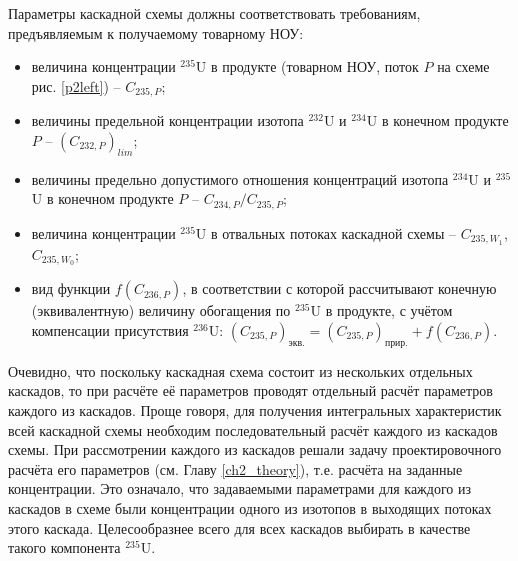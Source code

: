 Параметры каскадной схемы должны соответствовать требованиям, предъявляемым к получаемому товарному НОУ:

\begin{itemize}
    \item величина концентрации $^{235}$U в продукте (товарном НОУ, поток $P$ на схеме рис. \ref{p2left}) -- $C_{235,{P}}$;
    \item величины предельной концентрации изотопа $^{232}$U и $^{234}$U в конечном продукте $P$ -- $(C_{232,{P}})_{lim}$;
    \item величины предельно допустимого отношения концентраций изотопа $^{234}$U и $^{235}$U в конечном продукте $P$ -- ${C_{234,{P}}}/{C_{235,{P}}}$;
    \item величина концентрации $^{235}$U в отвальных потоках каскадной схемы -- $C_{235,{W_1}}$, $C_{235,{W_0}}$;
    \item вид функции $f(C_{236,P})$, в соответствии с которой рассчитывают конечную (эквивалентную) величину обогащения по $^{235}$U в продукте, с учётом компенсации присутствия $^{236}$U:
    $(C_{235,P})_\textit{экв.}=(C_{235,P})_\textit{прир.}+f(C_{236,P})$.    
\end{itemize}

Очевидно, что поскольку каскадная схема состоит из нескольких отдельных каскадов, то при расчёте её параметров проводят отдельный расчёт параметров каждого из каскадов. Проще говоря, для получения интегральных характеристик всей каскадной схемы необходим последовательный расчёт каждого из каскадов схемы. При рассмотрении каждого из каскадов решали задачу проектировочного расчёта его параметров (см. Главу \ref{ch2_theory}), т.е. расчёта на заданные концентрации. Это означало, что задаваемыми параметрами для каждого из каскадов в схеме были концентрации одного из изотопов в выходящих потоках этого каскада. Целесообразнее всего для всех каскадов выбирать в качестве такого компонента $^{235}$U.

